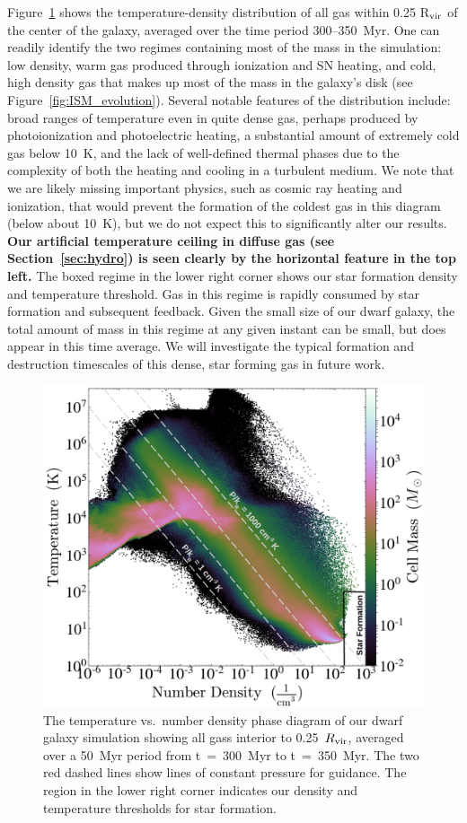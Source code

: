\documentclass[fleqn,usenatbib,useAMS]{mnras}
\begin{document}
Figure~\ref{fig:phase} shows the temperature-density distribution of all gas within 0.25 R$_{\rm vir}$ of the center of the galaxy, averaged over the time period 300--350~Myr. One can readily identify the two regimes containing most of the mass in the simulation: low density, warm gas produced through ionization and SN heating, and cold, high density gas that makes up most of the mass in the galaxy's disk (see Figure~\ref{fig:ISM_evolution}). Several notable features of the distribution include: broad ranges of temperature even in quite dense gas, perhaps produced by photoionization and photoelectric heating, a substantial amount of extremely cold gas below 10~K, and the lack of well-defined thermal phases due to the complexity of both the heating and cooling in a turbulent medium. We note that we are likely missing important physics, such as cosmic ray heating and ionization, that would prevent the formation of the coldest gas in this diagram (below about 10~K), but we do not expect this to significantly alter our results. \textbf{Our artificial temperature ceiling in diffuse gas (see Section~\ref{sec:hydro}) is seen clearly by the horizontal feature in the top left.}  The boxed regime in the lower right corner shows our star formation density and temperature threshold. Gas in this regime is rapidly consumed by star formation and subsequent feedback. Given the small size of our dwarf galaxy, the total amount of mass in this regime at any given instant can be small, but does appear in this time average. We will investigate the typical formation and destruction timescales of this dense, star forming gas in future work.

\begin{figure}
\includegraphics[width=0.95\linewidth]{phase_diagram.png}
\caption{The temperature vs.\ number density phase diagram of our dwarf galaxy simulation showing all gass interior to 0.25~$R_{\rm vir}$, averaged over a 50~Myr period from t~=~300~Myr to t~=~350~Myr. The two red dashed lines show lines of constant pressure for guidance. The region in the lower right corner indicates our density and temperature thresholds for star formation.}
\label{fig:phase}
\end{figure} 
\end{document}
